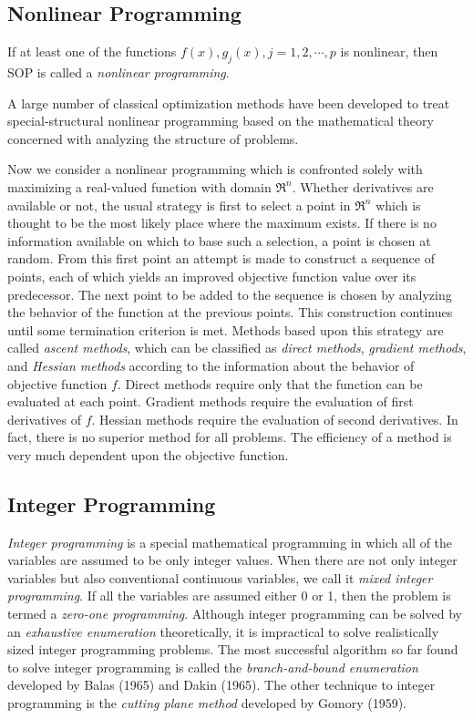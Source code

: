 \subsection{Nonlinear Programming}

If at least one of the functions $f(x),g_j(x),j=1,2,\cdots,p$ is nonlinear, then
SOP is called a {\em nonlinear programming}.

A large number of classical optimization methods have been developed to treat
special-structural nonlinear programming based on the mathematical theory
concerned with analyzing the structure of problems.

Now we consider a nonlinear programming which is confronted solely with
maximizing a real-valued function with domain $\Re^n$.  Whether derivatives are
available or not, the usual strategy is first to select a point in $\Re^n$ which
is thought to be the most likely place where the maximum exists. If there is no
information available on which to base such a selection, a point is chosen at
random. From this first point an attempt is made to construct a sequence of
points, each of which yields an improved objective function value over its
predecessor. The next point to be added to the sequence is chosen by analyzing
the behavior of the function at the previous points. This construction continues
until some termination criterion is met. Methods based upon this strategy are
called {\em ascent methods}, which can be classified as {\em direct methods},
{\em gradient methods}, and {\em Hessian methods} according to the information
about the behavior of objective function $f$. Direct methods require only that
the function can be evaluated at each point. Gradient methods require the
evaluation of first derivatives of $f$. Hessian methods require the evaluation
of second derivatives. In fact, there is no superior method for all
problems. The efficiency of a method is very much dependent upon the objective
function.

\subsection{Integer Programming}

{\em Integer programming} is a special mathematical programming in which all of
the variables are assumed to be only integer values. When there are not only
integer variables but also conventional continuous variables, we call it {\em
		mixed integer programming}. If all the variables are assumed either 0 or 1,
then the problem is termed a {\em zero-one programming}. Although integer
programming can be solved by an {\em exhaustive enumeration} theoretically, it
is impractical to solve realistically sized integer programming problems. The
most successful algorithm so far found to solve integer programming is called
the {\em branch-and-bound enumeration} developed by Balas (1965) and Dakin
(1965). The other technique to integer programming is the {\em cutting plane
		method} developed by Gomory (1959).

